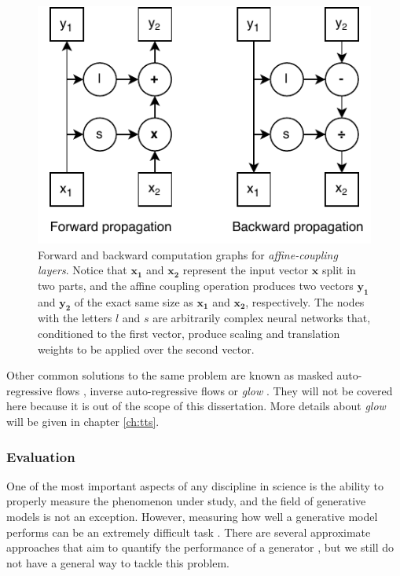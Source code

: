 \begin{figure}[h!]
	\centering
	\includegraphics[width=0.5\linewidth]{background/images/affinecouplingblock}
	\caption[Normalizing flows affine coupling layers]{Forward and backward computation graphs for \textit{affine-coupling layers}. Notice that $\mathbf{x_1}$ and $\mathbf{x_2}$ represent the input vector $\mathbf{x}$ split in two parts, and the affine coupling operation produces two vectors $\mathbf{y_1}$ and $\mathbf{y_2}$ of the exact same size as $\mathbf{x_1}$ and $\mathbf{x_2}$, respectively. The nodes with the letters $l$ and $s$ are arbitrarily complex neural networks that, conditioned to the first vector, produce scaling and translation weights to be applied over the second vector.}
	\label{fig:affinecouplingblock}
\end{figure}


Other common solutions to the same problem are known as masked auto-regressive flows \autocite{papamakarios2017}, inverse auto-regressive flows \autocite{kingma2016} or \textit{glow} \autocite{kingma2018}. They will not be covered here because it is out of the scope of this dissertation. More details about \textit{glow} will be given in chapter \ref{ch:tts}.


\subsubsection{Evaluation} \label{sec:dgmevaluation}
One of the most important aspects of any discipline in science is the ability to properly measure the phenomenon under study, and the field of generative models is not an exception. However, measuring how well a generative model performs can be an extremely difficult task \autocite{Goodfellow2016}. There are several approximate approaches that aim to quantify the performance of a generator \autocite{theis2016a}, but we still do not have a general way to tackle this problem.

